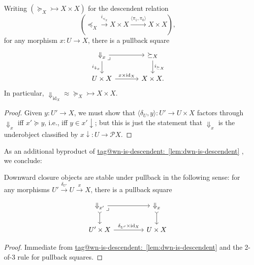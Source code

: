 \documentclass{amsart}
\makeatletter
\newcommand\br[1]{\langle{}#1\rangle{}}
\newcommand\dwn{\mathpunct{\downarrow}}
\newcommand\Dwn{{\Downarrow}}
\newcommand\id{\mathrm{id}}
\newcommand\pb[1][rd]{\ar[#1, phantom, "\lrcorner", pos=0]}
\newcommand\pow{\mathcal{P}}
\newcommand\tox[2][]{\xrightarrow[#1]{#2}}
\newcommand\tto{\rightarrowtail}
\newcommand\tagword[1]{\csname tag@#1\endcsname}
\def\label@tag#1:#2\@nil{#1}
\newcommand\labeltag[1]{\label@tag#1:\@nil}
\newcommand\jref[1]{%
  \texorpdfstring%
    {\hyperref[#1]{\tagword{\labeltag{#1}}~\ref*{#1}}}%
    {\tagword{\labeltag{#1}}~\ref*{#1}}%
}
\theoremstyle{definition}
\theoremstyle{remark}
\theoremstyle{plainwithref}
\makeatother
\begin{document}
\begin{lem} \label{lem:dwn-is-descendent}
  Writing \( ({\succeq}_X \tto X \times X) \) for the descendent relation
  \[
    ({\preceq}_X \tox{i_{{\preceq}_X}} X \times X \tox{\br{\pi_1, \pi_0}} X \times X),
  \]
  for any morphism \( x \colon U \to X \), there is a pullback square
  \[
    \begin{tikzcd}
      \Dwn_x \pb \ar[r, ""] \ar[d, "i_{\Dwn_x}"'] &[10pt] \succeq_X \ar[d, "i_{\succeq_X}"] \\
      U \times X \ar[r, "x \times \id_X"] & X \times X.
    \end{tikzcd}
  \]
  In particular, \( \Dwn_{\id_X} \approx {\succeq}_X \tto X \times X \).
\end{lem}

\begin{proof}
  Given \( y \colon U' \to X \), we must show that \( \br{\delta_U, y} \colon U' \to U \times X \) factors through \( \Dwn_x \) iff \( x' \succeq y \), i.e., iff \( y \in x' \dwn \); but this is just the statement that \( \Dwn_x \) is the underobject classified by \( x \dwn \colon U \to \pow X \).
\end{proof}

As an additional byproduct of \jref{lem:dwn-is-descendent}, we conclude:
\begin{cor} \label{cor:dwn-stable}
  Downward closure objects are stable under pullback in the following sense: for any morphisms \( U' \tox{\delta_{U'}} U \tox{x} X \), there is a pullback square
  \[
    \begin{tikzcd}
      \Dwn_{x'} \pb \ar[r, ""] \ar[d, >->] &[20pt] \Dwn_x \ar[d, >->] \\
      U' \times X \ar[r, "\delta_{U'} \times \id_X"] & U \times X
    \end{tikzcd}
  \]
\end{cor}
\begin{proof}
  Immediate from \jref{lem:dwn-is-descendent} and the 2-of-3 rule for pullback squares.
\end{proof}
\end{document}
